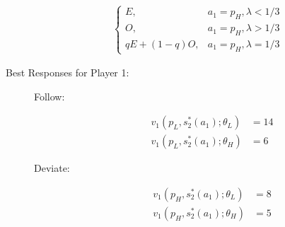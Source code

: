 \documentclass[10pt]{extarticle}
\begin{document}
\begin{description}
\begin{align*}
\begin{cases}
             E,&a_1 = p_H,\lambda < 1/3\\
             O,&a_1 = p_H,\lambda > 1/3\\
             qE + (1-q)O,&a_1 = p_H,\lambda = 1/3
           \end{cases}
        \end{align*}
      \item[Best Responses for Player 1:]\hfill
        \begin{description}
          \item[Follow:]
            \begin{align*}
              v_1(p_L,s_2^{\ast}(a_1);\theta_L) &= 14\\
              v_1(p_L,s_2^{\ast}(a_1);\theta_H) &= 6
            \end{align*}
          \item[Deviate:] 
            \begin{align*}
              v_1(p_H,s_2^{\ast}(a_1);\theta_L) &= 8\\
              v_1(p_H,s_2^{\ast}(a_1);\theta_H) &= 5
            \end{align*}
        \end{description}
    \end{description}
\end{document}
